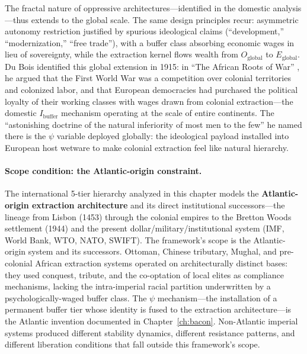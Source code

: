 The fractal nature of oppressive architectures---identified in the domestic analysis---thus extends to the global scale. The same design principles recur: asymmetric autonomy restriction justified by spurious ideological claims (``development,'' ``modernization,'' ``free trade''), with a buffer class absorbing economic wages in lieu of sovereignty, while the extraction kernel flows wealth from $O_{\text{global}}$ to $E_{\text{global}}$. Du Bois identified this global extension in 1915: in ``The African Roots of War'' \cite{dubois_african_roots}, he argued that the First World War was a competition over colonial territories and colonized labor, and that European democracies had purchased the political loyalty of their working classes with wages drawn from colonial extraction---the domestic $I_{\text{buffer}}$ mechanism operating at the scale of entire continents. The ``astonishing doctrine of the natural inferiority of most men to the few'' he named there is the $\psi$ variable deployed globally: the ideological payload installed into European host wetware to make colonial extraction feel like natural hierarchy.

\paragraph{Scope condition: the Atlantic-origin constraint.} The international 5-tier hierarchy analyzed in this chapter models the \textbf{Atlantic-origin extraction architecture} and its direct institutional successors---the lineage from Lisbon (1453) through the colonial empires to the Bretton Woods settlement (1944) and the present dollar/military/institutional system (IMF, World Bank, WTO, NATO, SWIFT). The framework's scope is the Atlantic-origin system and its successors. Ottoman, Chinese tributary, Mughal, and pre-colonial African extraction systems operated on architecturally distinct bases: they used conquest, tribute, and the co-optation of local elites as compliance mechanisms, lacking the intra-imperial racial partition underwritten by a psychologically-waged buffer class. The $\psi$ mechanism---the installation of a permanent buffer tier whose identity is fused to the extraction architecture---is the Atlantic invention documented in Chapter~\ref{ch:bacon}. Non-Atlantic imperial systems produced different stability dynamics, different resistance patterns, and different liberation conditions that fall outside this framework's scope.

